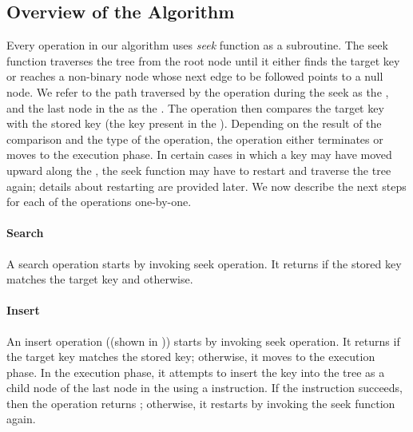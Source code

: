 \begin{limitscope}
\subsection{Overview of the Algorithm}

Every operation in our algorithm uses \emph{seek} function as a subroutine. The seek function traverses the  tree from the root node until it either finds the target key or reaches a non-binary node whose next edge to be followed points to a null node. We refer to the path traversed by the operation during the seek  as the \emph{\accesspath}, and the last node in the \accesspath{} as the \emph{\terminalnode}. The operation then compares the target key with the stored key (the key present in the \terminalnode). Depending on the result of the comparison and the type of the operation, the operation either terminates or moves to the execution phase. In certain cases in which a key may have moved upward along the \accesspath, the seek function may have to restart and traverse the tree again; details about restarting are provided later. We now describe the next steps for each of the operations one-by-one.

\paragraph*{Search} 
A search operation starts by invoking seek operation. It returns \true{} if the stored key matches the target key and \false{} otherwise. 

\paragraph*{Insert}

An insert operation ((shown in )) starts by invoking seek operation. It returns \false{} if the target key matches the stored key; otherwise, it moves to the execution phase. In the execution phase, it attempts to insert the key into the tree as a child node of the last node in the \accesspath{} using a \CAS{} instruction. If the instruction succeeds, then the operation returns \true{}; otherwise, it restarts by invoking the seek function again.


\end{limitscope}

